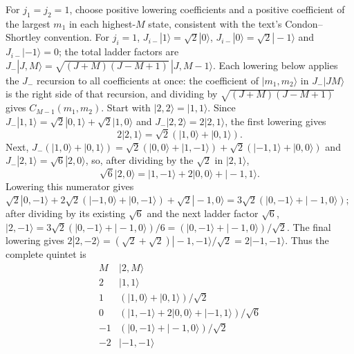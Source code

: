 For $j_1=j_2=1$, choose positive lowering coefficients and a positive
coefficient of the largest $m_1$ in each highest-$M$ state, consistent
with the text's Condon--Shortley convention. For $j_i=1$,
$J_{i-}|1\rangle=\sqrt2|0\rangle$, $J_{i-}|0\rangle=\sqrt2|-1\rangle$
and $J_{i-}|-1\rangle=0$; the total ladder factors are
$J_-|J,M\rangle=\sqrt{(J+M)(J-M+1)}\,|J,M-1\rangle$.
Each lowering below applies the $J_-$ recursion to all coefficients
at once: the coefficient of $|m_1,m_2\rangle$ in $J_-|JM\rangle$ is
the right side of that recursion, and dividing by
$\sqrt{(J+M)(J-M+1)}$ gives $C_{M-1}(m_1,m_2)$.
Start with $|2,2\rangle=|1,1\rangle$. Since
$J_-|1,1\rangle=\sqrt2|0,1\rangle+\sqrt2|1,0\rangle$ and
$J_-|2,2\rangle=2|2,1\rangle$, the first lowering gives
\[
2|2,1\rangle
=\sqrt2(|1,0\rangle+|0,1\rangle).
\]
Next, $J_-(|1,0\rangle+|0,1\rangle)
=\sqrt2(|0,0\rangle+|1,-1\rangle)+\sqrt2(|-1,1\rangle+|0,0\rangle)$
and $J_-|2,1\rangle=\sqrt6|2,0\rangle$, so, after dividing by the
$\sqrt2$ in $|2,1\rangle$,
\[
\sqrt6|2,0\rangle
=|1,-1\rangle+2|0,0\rangle+|-1,1\rangle.
\]
Lowering this numerator gives
$\sqrt2|0,-1\rangle+2\sqrt2(|-1,0\rangle+|0,-1\rangle)
+\sqrt2|-1,0\rangle=3\sqrt2(|0,-1\rangle+|-1,0\rangle)$;
after dividing by its existing $\sqrt6$ and the next ladder factor
$\sqrt6$,
$|2,-1\rangle=3\sqrt2(|0,-1\rangle+|-1,0\rangle)/6
=(|0,-1\rangle+|-1,0\rangle)/\sqrt2$.
The final lowering gives
$2|2,-2\rangle=(\sqrt2+\sqrt2)|-1,-1\rangle/\sqrt2=2|-1,-1\rangle$.
Thus the complete quintet is
\[
\begin{array}{c|l}
M&|2,M\rangle\\ \hline
2&|1,1\rangle\\
1&(|1,0\rangle+|0,1\rangle)/\sqrt2\\
0&(|1,-1\rangle+2|0,0\rangle+|-1,1\rangle)/\sqrt6\\
-1&(|0,-1\rangle+|-1,0\rangle)/\sqrt2\\
-2&|-1,-1\rangle
\end{array}
\]

